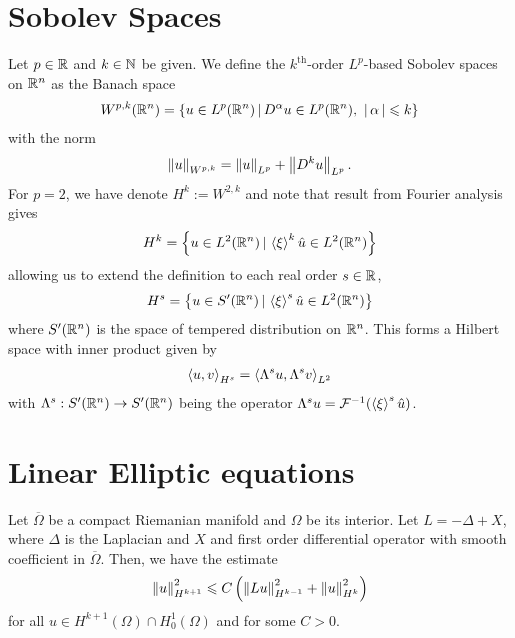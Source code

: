 \documentclass{article}
\begin{document}
\section{Sobolev Spaces \cite[Chapter 4]{taylor_pde}}
\begin{fdefinition} Let $p \in \R$ and $k \in \N$ be given. We define the $k^{\text{th}}$-order $L^p$-based Sobolev spaces on $\R^n$ as the Banach space
\begin{align*}
W^{p, k}(\R^n) = \set{u \in L^p(\R^n) \wh D^\alpha u \in L^p(\R^n), \, \, \abs{\alpha} \leq k }
\end{align*}
with the norm
\begin{align*}
\norm[u]_{W^{p, k}} = \norm[u]_{L^p} + \norm[D^k u]_{L^p}. 
\end{align*}
For $p = 2$, we have denote $H^k := W^{2, k}$ and note that result from Fourier analysis gives
\begin{align*}
H^k = \set{u \in L^2(\R^n) \wh \abrac{\xi}^k \hat{u} \in L^2(\R^n)}
\end{align*}
allowing us to extend the definition to each real order $s \in \R$, 
\begin{align*}
H^s = \set{u \in S'(\R^n) \wh \abrac{\xi}^s \hat{u} \in L^2(\R^n)}
\end{align*}
where $S'(\R^n)$ is the space of tempered distribution on $\R^n$. This forms a Hilbert space with inner product given by
\begin{align*}
\inprod[u, v]_{H^s} = \inprod[ \Lambda^su, \Lambda^sv]_{L^2}
\end{align*}
with $\Lambda^s: S'(\R^n) \to S'(\R^n)$ being the operator $\Lambda^su = \F^{-1}(\abrac{\xi}^s \hat{u})$. 
\end{fdefinition}



\section{Linear Elliptic equations \cite[Chapter 5]{taylor_pde}}
\begin{ftheorem} Let $\overline{\Omega}$ be a compact Riemanian manifold and $\Omega$ be its interior. Let $L = -\Delta + X$, where $\Delta$ is the Laplacian and $X$ and first order differential operator with smooth coefficient in $\overline{\Omega}$. Then, we have the estimate
\begin{align*}
\norm[u]_{H^{k +1}}^2 \leq C \brac{\norm[Lu]_{H^{k -1}}^2 + \norm[u]_{H^k}^2}
\end{align*}
for all $u \in H^{k + 1}(\Omega) \cap H^1_0(\Omega)$ and for some $C > 0$. 
\end{ftheorem}
\end{document}
